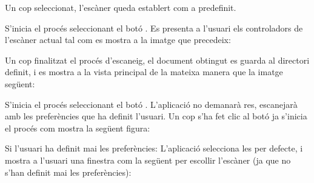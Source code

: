 \documentclass[letterpaper,11pt,catalan]{sphinxmanual}
\begin{document}

Un cop seleccionat, l'escàner queda establert com a predefinit.

\begin{DUlineblock}{0em}
\item[] 
\end{DUlineblock}

S'inicia el procés seleccionant el botó .
Es presenta a l'usuari els controladors de l'escàner actual tal com es mostra a la
imatge que precedeix:


Un cop finalitzat el procés d'escaneig, el document obtingut es guarda al directori definit, i es
mostra a la vista principal de la mateixa manera que la imatge següent:


\begin{DUlineblock}{0em}
\item[] 
\end{DUlineblock}

S'inicia el procés seleccionant el botó .
L'aplicació no demanarà res, escanejarà amb les preferències que ha definit l'usuari.
Un cop s'ha fet clic al botó  ja s'inicia el procés com mostra la següent figura:


Si l'usuari  ha definit mai les preferències: L'aplicació selecciona les per defecte, i mostra
a l'usuari una finestra com la següent per escollir l'escàner (ja que no s'han definit mai les preferències):

\end{document}
